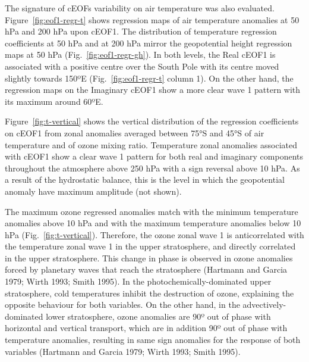 \documentclass[smallextended]{svjour3}       %
\begin{document}
The signature of cEOFs variability on air temperature was also evaluated.
Figure~\ref{fig:eof1-regr-t} shows regression maps of air temperature anomalies at 50 hPa and 200 hPa upon cEOF1.
The distribution of temperature regression coefficients at 50 hPa and at 200 hPa mirror the geopotential height regression maps at 50 hPa (Fig.~\ref{fig:eof1-regr-gh}).
In both levels, the Real cEOF1 is associated with a positive centre over the South Pole with its centre moved slightly towards 150ºE (Fig.~\ref{fig:eof1-regr-t} column 1).
On the other hand, the regression maps on the Imaginary cEOF1 show a more clear wave 1 pattern with its maximum around 60ºE.

Figure~\ref{fig:t-vertical} shows the vertical distribution of the regression coefficients on cEOF1 from zonal anomalies averaged between 75°S and 45°S of air temperature and of ozone mixing ratio.
Temperature zonal anomalies associated with cEOF1 show a clear wave 1 pattern for both real and imaginary components throughout the atmosphere above 250 hPa with a sign reversal above 10 hPa.
As a result of the hydrostatic balance, this is the level in which the geopotential anomaly have maximum amplitude (not shown).

The maximum ozone regressed anomalies match with the minimum temperature anomalies above 10 hPa and with the maximum temperature anomalies below 10 hPa (Fig.~\ref{fig:t-vertical}).
Therefore, the ozone zonal wave 1 is anticorrelated with the temperature zonal wave 1 in the upper stratosphere, and directly correlated in the upper stratosphere.
This change in phase is observed in ozone anomalies forced by planetary waves that reach the stratosphere (Hartmann and Garcia 1979; Wirth 1993; Smith 1995).
In the photochemically-dominated upper stratosphere, cold temperatures inhibit the destruction of ozone, explaining the opposite behaviour for both variables.
On the other hand, in the advectively-dominated lower stratosphere, ozone anomalies are 90º out of phase with horizontal and vertical transport, which are in addition 90º out of phase with temperature anomalies, resulting in same sign anomalies for the response of both variables (Hartmann and Garcia 1979; Wirth 1993; Smith 1995).
\end{document}
